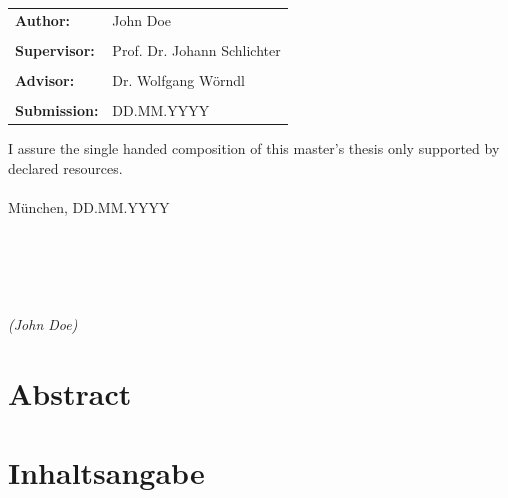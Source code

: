 \documentclass[12pt,oneside, reqno]{report}
\begin{document}
\begin{tabular}{ll}
{\Large \bf Author:} & {\Large John Doe} \\\\
{\Large \bf Supervisor:} & {\Large Prof. Dr. Johann Schlichter} \\\\
{\Large \bf Advisor:} & {\Large Dr. Wolfgang Wörndl} \\\\
{\Large \bf Submission:} & {\Large DD.MM.YYYY}
\end{tabular}

\newpage	
\thispagestyle{empty}
\hoffset=0mm
\vspace*{\fill}
\noindent I assure the single handed composition of this master's thesis only supported by declared resources.\\\\
München, DD.MM.YYYY\\\\\\\\\\\\
\noindent \textit{(John Doe)}

\newpage
\thispagestyle{empty}
\null

\newpage
\thispagestyle{empty}
\hoffset=0mm
\section*{Abstract}	
\begin{spacing}{1.2}

\end{spacing}
	
\section*{Inhaltsangabe}
\begin{spacing}{1.2}

\end{spacing}

\newpage
\setcounter{page}{1}
\hoffset=0mm
\setcounter{tocdepth}{3}
\setcounter{secnumdepth}{3}
\fboxsep 0mm


\newpage
\end{document}
